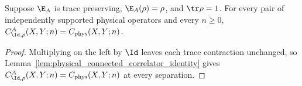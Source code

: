\begin{lemma}
    \label{thm:physical_left_right_tp}
    \leanok
    Suppose $\E_A$ is trace preserving, $\E_A(\rho)=\rho$, and
    $\tr\rho=1$. For every pair of independently supported physical
    operators and every $n\geq0$,
    $C_{\Id,\rho}^{A}(X,Y;n)=C_{\mathrm{phys}}(X,Y;n)$.
\end{lemma}
\begin{proof}
    \leanok
    Multiplying on the left by $\Id$ leaves each trace contraction unchanged,
    so Lemma~\ref{lem:physical_connected_correlator_identity} gives
    $C_{\Id,\rho}^{A}(X,Y;n)=C_{\mathrm{phys}}(X,Y;n)$ at every separation.
\end{proof}

